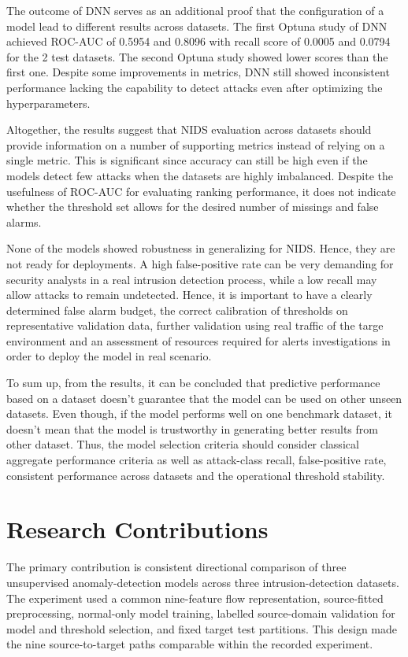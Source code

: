 The outcome of DNN serves as an additional proof that the configuration of a model lead to different results across datasets. The first Optuna study of DNN achieved ROC-AUC 
of 0.5954 and 0.8096 with recall score of 0.0005 and 0.0794 for the 2 test datasets. The second Optuna study showed lower scores than the first one. Despite some improvements 
in metrics, DNN still showed inconsistent performance lacking the capability to detect attacks even after optimizing the hyperparameters.

Altogether, the results suggest that NIDS evaluation across datasets should provide information on a number of supporting metrics instead of relying on a single metric. This is 
significant since accuracy can still be high even if the models detect few attacks when the datasets are highly imbalanced. Despite the usefulness of ROC-AUC for evaluating ranking 
performance, it does not indicate whether the threshold set allows for the desired number of missings and false alarms.

None of the models showed robustness in generalizing for NIDS. Hence, they are not ready for deployments. A high false-positive rate can be very demanding for security analysts in a 
real intrusion detection process, while a low recall may allow attacks to remain undetected. Hence, it is important to have a clearly determined false alarm budget, the correct calibration 
of thresholds on representative validation data, further validation using real traffic of the targe environment and an assessment of resources required for alerts investigations in order to 
deploy the model in real scenario.

To sum up, from the results, it can be concluded that predictive performance based on a dataset doesn't guarantee that the model can be used on other unseen datasets. Even though, if the model
performs well on one benchmark dataset, it doesn't mean that the model is trustworthy in generating better results from other dataset. Thus, the model selection criteria should consider classical 
aggregate performance criteria as well as attack-class recall, false-positive rate, consistent performance across datasets and the operational threshold stability. 
\section{Research Contributions}
\label{sec:conclusion-contributions}

The primary contribution is consistent directional comparison of three unsupervised anomaly-detection models across three intrusion-detection 
datasets. The experiment used a common nine-feature flow representation, source-fitted preprocessing, normal-only model training, labelled 
source-domain validation for model and threshold selection, and fixed target test partitions. This design made the nine source-to-target paths 
comparable within the recorded experiment.

